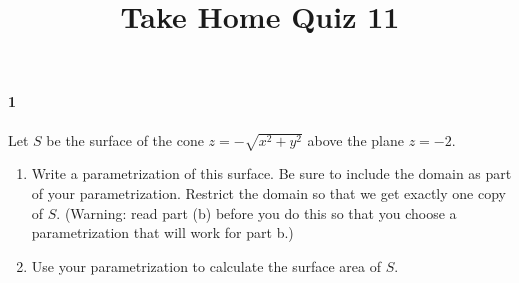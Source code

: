 \documentclass{article}
\title{Take Home Quiz 11}
\author{}
\date{}
\begin{document}
    \maketitle

    \paragraph{1} Let $S$ be the surface of the cone $z=-\sqrt{x^2+y^2}$ above the plane $z=-2$.
    \begin{enumerate}[label=(\alph*)]
        \item Write a parametrization of this surface. Be sure to include the domain as part of your parametrization. Restrict the domain so that we get exactly one copy of $S$. (Warning: read part (b) before you do this so that you choose a parametrization that will work for part b.)
        \item Use your parametrization to calculate the surface area of $S$.
    \end{enumerate}
\end{document}
